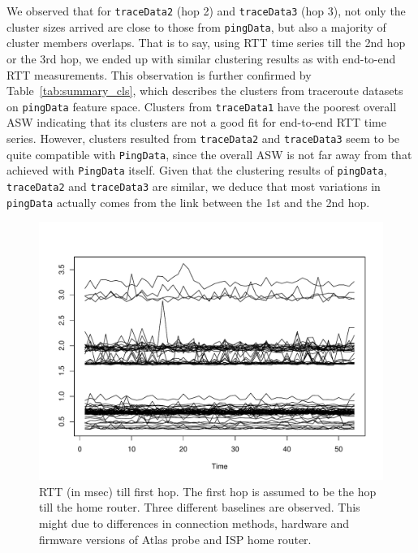 We observed that for \texttt{traceData2} (hop 2) and \texttt{traceData3} (hop 3), not only the cluster sizes arrived are close to those from \texttt{pingData}, but also a majority of cluster members overlaps. 
That is to say, using RTT time series till the 2nd hop or the 3rd hop, we ended up with similar clustering results as with end-to-end RTT measurements. 
This observation is further confirmed by Table~\ref{tab:summary_cls}, which describes the clusters from traceroute datasets on \texttt{pingData} feature space.
Clusters from \texttt{traceData1} have the poorest overall \ac{ASW} indicating that its clusters are not a good fit for end-to-end RTT time series. 
However, clusters resulted from \texttt{traceData2} and \texttt{traceData3} seem to be quite compatible with \texttt{PingData}, since the overall \ac{ASW} is not far away from that achieved with \texttt{PingData} itself.
Given that the clustering results of \texttt{pingData}, \texttt{traceData2} and \texttt{traceData3} are similar, we deduce that most variations in \texttt{pingData} actually comes from the link between the 1st and the 2nd hop.

\begin{figure}[!htb]
\centering
\includegraphics[width=\textwidth]{gfx/chap3/trace1_cls2_traceRTT.pdf}
\caption{RTT (in msec) till first hop. The first hop is assumed to be the hop till the home router. Three different baselines are observed. This might due to differences in connection methods, hardware and firmware versions of Atlas probe and ISP home router.}
\label{fig:trace1_traceRTT}
\end{figure}

